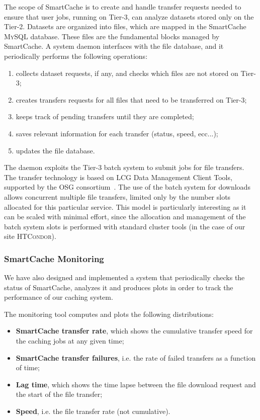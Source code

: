 The scope of SmartCache is to create and handle transfer requests needed to ensure that 
user jobs, running on Tier-3, can analyze datasets stored only on the Tier-2. Datasets are organized into 
files, which are mapped in the SmartCache \textsc{MySQL} database. These files are the fundamental blocks 
managed by SmartCache. A system daemon interfaces with the file database, and it periodically 
performs the following operations:

\begin{enumerate}
	\item collects dataset requests, if any, and checks which files are not stored on Tier-3;
	\item creates transfers requests for all files that need to be transferred on Tier-3;
	\item keeps track of pending transfers until they are completed;
	\item saves relevant information for each transfer (status, speed, ecc...);
	\item updates the file database.
\end{enumerate}

The daemon exploits the Tier-3 batch system to submit jobs for file transfers. The transfer technology 
is based on LCG Data Management Client Tools, supported by the OSG consortium~\cite{OSG1,OSG2}. The use of 
the batch system for downloads allows concurrent multiple file transfers, limited only by the number slots 
allocated for this particular service. This model is particularly interesting as it can be scaled with minimal 
effort, since the allocation and management of the batch system slots is performed with standard cluster 
tools (in the case of our site \textsc{HTCondor}).

\subsubsection{SmartCache Monitoring}

We have also designed and implemented a system that periodically checks the status of SmartCache, analyzes it
and produces plots in order to track the performance of our caching system.

The monitoring tool computes and plots the following distributions:

\begin{itemize}
	\item \textbf{SmartCache transfer rate}, which shows the cumulative transfer speed for the caching jobs at
	any given time;
	\item \textbf{SmartCache transfer failures}, i.e. the rate of failed transfers as a function of time;
	\item \textbf{Lag time}, which shows the time lapse between the file download request and the start of the file transfer;
	\item \textbf{Speed}, i.e. the file transfer rate (not cumulative).
\end{itemize}

